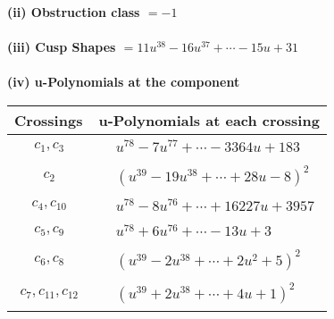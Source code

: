 \documentclass[1p]{elsarticle_modified}
\theoremstyle{definition}
\begin{document}
\flushleft \textbf{(ii) Obstruction class $= -1$}\\~\\
\flushleft \textbf{(iii) Cusp Shapes $= 11 u^{38}-16 u^{37}+\cdots-15 u+31$}\\~\\
\newpage\renewcommand{\arraystretch}{1}
\flushleft \textbf{(iv) u-Polynomials at the component}\newline \\
\begin{tabular}{m{50pt}|m{274pt}}
Crossings & \hspace{64pt}u-Polynomials at each crossing \\
\hline $$\begin{aligned}c_{1},c_{3}\end{aligned}$$&$\begin{aligned}
&u^{78}-7 u^{77}+\cdots-3364 u+183
\end{aligned}$\\
\hline $$\begin{aligned}c_{2}\end{aligned}$$&$\begin{aligned}
&(u^{39}-19 u^{38}+\cdots+28 u-8)^{2}
\end{aligned}$\\
\hline $$\begin{aligned}c_{4},c_{10}\end{aligned}$$&$\begin{aligned}
&u^{78}-8 u^{76}+\cdots+16227 u+3957
\end{aligned}$\\
\hline $$\begin{aligned}c_{5},c_{9}\end{aligned}$$&$\begin{aligned}
&u^{78}+6 u^{76}+\cdots-13 u+3
\end{aligned}$\\
\hline $$\begin{aligned}c_{6},c_{8}\end{aligned}$$&$\begin{aligned}
&(u^{39}-2 u^{38}+\cdots+2 u^2+5)^{2}
\end{aligned}$\\
\hline $$\begin{aligned}c_{7},c_{11},c_{12}\end{aligned}$$&$\begin{aligned}
&(u^{39}+2 u^{38}+\cdots+4 u+1)^{2}
\end{aligned}$\\
\hline
\end{tabular}\\~\\
\end{document}
